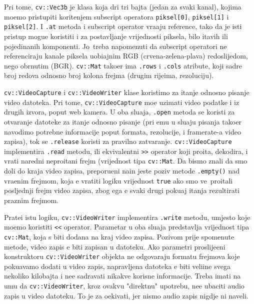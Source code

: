 Pri tome, \lstinline{cv::Vec3b} je klasa koja dr\zh i tri bajta (jedan za svaki kanal), kojima mo\zh emo pristupiti kori\sh tenjem subscript operatora \lstinline{piksel[0]}, \lstinline{piksel[1]} i \lstinline{piksel[2]}. 
I \lstinline{.at} metoda i subscript operator vra\cj aju reference, tako da je isti pristup mogu\cj e koristiti i za postavljanje vrijednosti piksela, bilo \ch itavih ili pojedina\ch nih komponenti. 
Jo\sh\ treba napomenuti da subscript operatori ne referenciraju kanale piksela uobi\ch ajnim RGB (crvena-zelena-plava) redoslijedom, nego obrnutim (BGR). \lstinline{cv::Mat} tako\dj er ima \lstinline{.rows} i 
\lstinline{.cols} atribute, koji sadr\zh e broj redova odnosno broj kolona frejma (drugim rije\ch ima, rezoluciju).

\lstinline{cv::VideoCapture} i \lstinline{cv::VideoWriter} klase koristimo za \ch itanje odnosno pisanje video datoteka. Pri tome, \lstinline{cv::VideoCapture} mo\zh e uzimati video podatke i iz drugih izvora,
poput web kamera. U oba slu\ch aja, \lstinline{.open} metoda se koristi za otvaranje datoteke za \ch itanje odnosno pisanje (pri \ch emu u slu\ch aju pisanja tako\dj er navodimo potrebne informacije poput
formata, rezolucije, i framerate-a video zapisa), tok se \lstinline{.release} koristi za pravilno zatvaranje. \lstinline{cv::VideoCapture} implementira \lstinline{.read} metodu, ili ekvivalentni \lstinline{>>} operator koji
pro\ch ita, dekodira, i vrati naredni nepro\ch itani frejm (vrijednost tipa \lstinline{cv::Mat}. Da bismo znali da smo do\sh li do kraja video zapisa, preporu\ch eni na\ch in jeste poziv metode \lstinline{.empty()} 
nad vra\cj enim frejmom, koja \cj e vratiti logi\ch ku vrijednost \lstinline{true} ako smo ve\cj\ pro\ch itali posljednji frejm video zapisa, zbog \ch ega \cj e svaki drugi poku\sh aj \ch itanja rezultirati praznim frejmom.

Prate\cj i istu logiku, \lstinline{cv::VideoWriter} implementira \lstinline{.write} metodu, umjesto koje mo\zh emo koristiti \lstinline{<<} operator. Parametar u oba slu\ch aja predstavlja vrijednost tipa
\lstinline{cv::Mat}, koja \cj s biti dodana na kraj video zapisa. Pozivom prije spomenute metode, video zapis \cj e biti zapisan u datoteku. Ako parametri proslije\dj eni konstruktoru \lstinline{cv::VideoWriter}
objekta ne odgovaraju formatu frejmova koje poku\sh avamo dodati u video zapis, napravljena datoteka \cj e biti veli\ch ine svega nekoliko kilobajta i ne\cj e sadr\zh avati nikakve korisne informacije.
Treba imati na umu da \lstinline{cv::VideoWriter}, kroz ovakvu "direktnu" upotrebu, ne\cj e ubaciti audio zapis u video datoteku. To je za o\ch ekivati, jer nismo audio zapis nigdje ni naveli.

